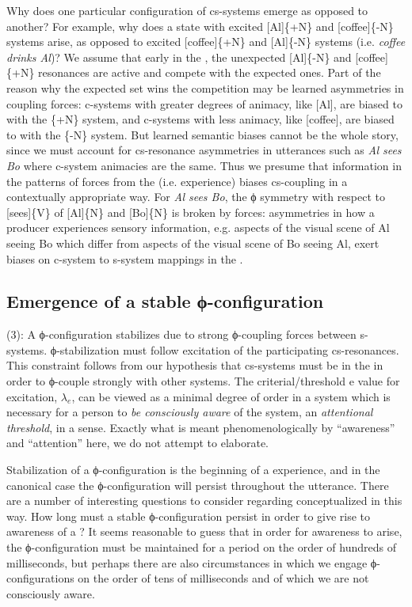   Why does one particular configuration of cs-systems emerge as opposed to another? For example, why does a state with excited [Al]\{+N\} and [coffee]\{-N\} systems arise, as opposed to excited [coffee]\{+N\} and [Al]\{-N\} systems (i.e. \textit{coffee drinks Al})? We assume that early in the , the unexpected [Al]\{-N\} and [coffee]\{+N\} resonances are active and compete with the expected ones. Part of the reason why the expected set wins the competition may be learned asymmetries in coupling forces: c-systems with greater degrees of animacy, like [Al], are biased to  with the \{+N\} system, and c-systems with less animacy, like [coffee], are biased to  with the \{-N\} system. But learned semantic biases cannot be the whole story, since we must account for cs-resonance asymmetries in utterances such as \textit{Al sees Bo} where c-system animacies are the same. Thus we presume that information in the patterns of forces from the  (i.e.  experience) biases cs-coupling in a contextually appropriate way. For \textit{Al sees Bo}, the ϕ symmetry with respect to [sees]\{V\} of [Al]\{N\} and [Bo]\{N\} is broken by  forces: asymmetries in how a producer experiences sensory information, e.g. aspects of the visual scene of Al seeing Bo which differ from aspects of the visual scene of Bo seeing Al, exert biases on c-system to s-system mappings in the .

\subsection{Emergence of a stable ϕ-configuration}

(3): A ϕ-configuration stabilizes due to strong ϕ{}-coupling forces between s-systems. ϕ{}-stabilization must follow excitation of the participating cs-resonances. This constraint follows from our hypothesis that cs-systems must be in the  in order to ϕ-couple strongly with other systems. The criterial/threshold e value for excitation, $\lambda_{e}$, can be viewed as a minimal degree of order in a system which is necessary for a person to \textit{be consciously aware} of the system, an \textit{attentional threshold}, in a sense. Exactly what is meant phenomenologically by “awareness” and “attention” here, we do not attempt to elaborate. 

   Stabilization of a ϕ-configuration is the beginning of a  experience, and in the canonical case the ϕ-configuration will persist throughout the utterance. There are a number of interesting questions to consider regarding  conceptualized in this way. How long must a stable ϕ-configuration persist in order to give rise to awareness of a ? It seems reasonable to guess that in order for awareness to arise, the ϕ-configuration must be maintained for a period on the order of hundreds of milliseconds, but perhaps there are also circumstances in which we engage ϕ-configurations on the order of tens of milliseconds and of which we are not consciously aware.

